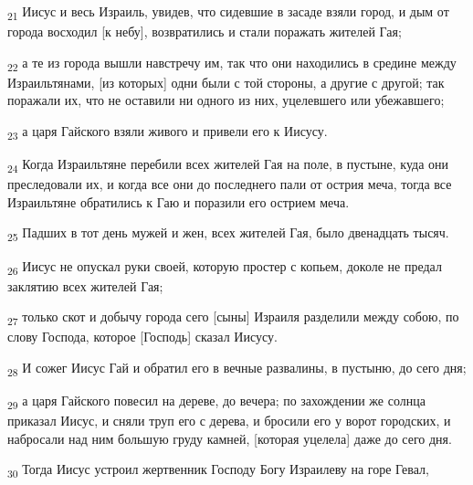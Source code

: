 \begin{tcolorbox}
\textsubscript{21} Иисус и весь Израиль, увидев, что сидевшие в засаде взяли город, и дым от города восходил [к небу], возвратились и стали поражать жителей Гая;
\end{tcolorbox}
\begin{tcolorbox}
\textsubscript{22} а те из города вышли навстречу им, так что они находились в средине между Израильтянами, [из которых] одни были с той стороны, а другие с другой; так поражали их, что не оставили ни одного из них, уцелевшего или убежавшего;
\end{tcolorbox}
\begin{tcolorbox}
\textsubscript{23} а царя Гайского взяли живого и привели его к Иисусу.
\end{tcolorbox}
\begin{tcolorbox}
\textsubscript{24} Когда Израильтяне перебили всех жителей Гая на поле, в пустыне, куда они преследовали их, и когда все они до последнего пали от острия меча, тогда все Израильтяне обратились к Гаю и поразили его острием меча.
\end{tcolorbox}
\begin{tcolorbox}
\textsubscript{25} Падших в тот день мужей и жен, всех жителей Гая, было двенадцать тысяч.
\end{tcolorbox}
\begin{tcolorbox}
\textsubscript{26} Иисус не опускал руки своей, которую простер с копьем, доколе не предал заклятию всех жителей Гая;
\end{tcolorbox}
\begin{tcolorbox}
\textsubscript{27} только скот и добычу города сего [сыны] Израиля разделили между собою, по слову Господа, которое [Господь] сказал Иисусу.
\end{tcolorbox}
\begin{tcolorbox}
\textsubscript{28} И сожег Иисус Гай и обратил его в вечные развалины, в пустыню, до сего дня;
\end{tcolorbox}
\begin{tcolorbox}
\textsubscript{29} а царя Гайского повесил на дереве, до вечера; по захождении же солнца приказал Иисус, и сняли труп его с дерева, и бросили его у ворот городских, и набросали над ним большую груду камней, [которая уцелела] даже до сего дня.
\end{tcolorbox}
\begin{tcolorbox}
\textsubscript{30} Тогда Иисус устроил жертвенник Господу Богу Израилеву на горе Гевал,
\end{tcolorbox}
